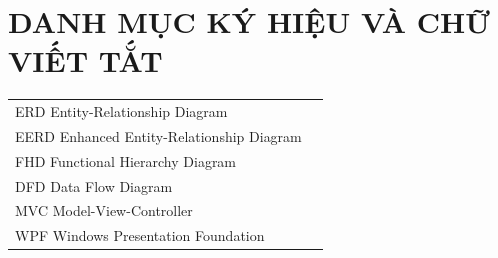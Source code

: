 \section*{DANH MỤC KÝ HIỆU VÀ CHỮ VIẾT TẮT}
 {}

\begin{tabular}{ l l }
    \hspace{1cm} ERD \> \hspace{4cm} Entity-Relationship Diagram \\  
    \hspace{1cm} EERD \> \hspace{4cm} Enhanced Entity-Relationship Diagram \\  
    \hspace{1cm} FHD \> \hspace{4cm} Functional Hierarchy Diagram \\  
    \hspace{1cm} DFD \> \hspace{4cm} Data Flow Diagram \\  
    \hspace{1cm} MVC \> \hspace{4cm} Model-View-Controller \\  
    \hspace{1cm} WPF \> \hspace{4cm} Windows Presentation Foundation \\ 
\end{tabular}  

\newpage